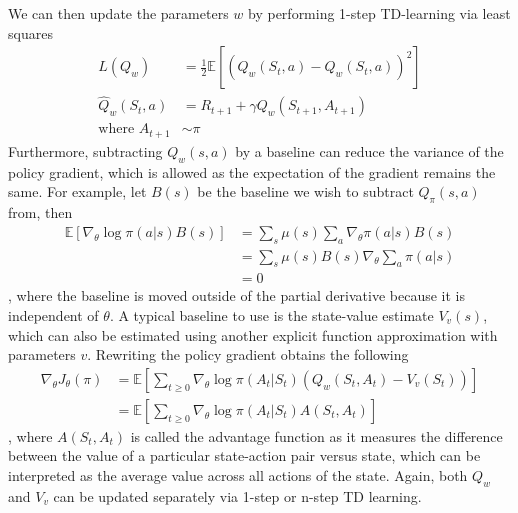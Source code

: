 \documentclass[12pt]{report}
\begin{document}
We can then update the parameters $w$ by performing 1-step TD-learning via least squares
\begin{align}
    L(Q_w)&=\frac{1}{2}\mathbb{E}\left[(\hat{Q}_w(S_t,a)-Q_w(S_t, a))^2\right]\nonumber\\
    \hat{Q}_w(S_t, a) &= R_{t+1} + \gamma Q_w(S_{t+1},A_{t+1}) \nonumber\\
    \text{where } A_{t+1} &\sim \pi \nonumber
\end{align}
Furthermore, subtracting $Q_w(s,a)$ by a baseline can reduce the variance of the policy gradient, which is allowed as the expectation of the gradient remains the same. For example, let $B(s)$ be the baseline we wish to subtract $Q_\pi(s,a)$ from, then
\begin{align}
    \mathbb{E}[\nabla_\theta \log \pi(a|s)B(s)] &= \sum_s \mu(s) \sum_a \nabla_\theta \pi(a|s)B(s) \nonumber\\
    &=\sum_s \mu(s) B(s) \nabla_\theta \sum_a \pi(a|s) \label{eq:policy-baseline}\\
    &= 0 \nonumber
\end{align}
, where the baseline is moved outside of the partial derivative because it is independent of $\theta$. A typical baseline to use is the state-value estimate $V_v(s)$, which can also be estimated using another explicit function approximation with parameters $v$. Rewriting the policy gradient obtains the following 
\begin{align}
    \nabla_\theta J_\theta(\pi) &= \mathbb{E}\left[\sum_{t\ge0} \nabla_\theta \log \pi(A_t|S_t) (Q_w(S_t, A_t) - V_v (S_t))\right] \label{eq:AC-Q-V-params}\\
    &= \mathbb{E}\left[\sum_{t\ge0} \nabla_\theta \log \pi(A_t|S_t) A(S_t, A_t)\right]
\end{align}
, where $A(S_t, A_t)$ is called the advantage function as it measures the difference between the value of a particular state-action pair versus state, which can be interpreted as the average value across all actions of the state. Again, both $Q_w$ and $V_v$ can be updated separately via 1-step or n-step TD learning.\\
\end{document}
